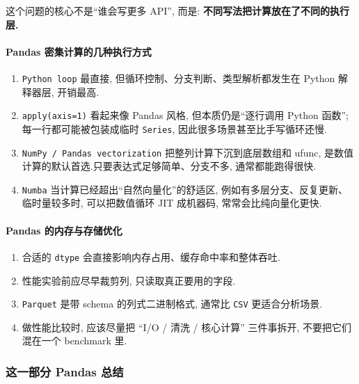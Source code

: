 \documentclass[11pt]{article}
\providecommand{\tightlist}{%
      \setlength{\itemsep}{0pt}\setlength{\parskip}{0pt}}
\begin{document}
    这个问题的核心不是``谁会写更多 API'', 而是:
\textbf{不同写法把计算放在了不同的执行层.}

    \paragraph{Pandas
密集计算的几种执行方式}\label{pandas-ux5bc6ux96c6ux8ba1ux7b97ux7684ux51e0ux79cdux6267ux884cux65b9ux5f0f}

    \begin{enumerate}
\def\labelenumi{\arabic{enumi}.}
\item
  \texttt{Python\ loop} 最直接, 但循环控制、分支判断、类型解析都发生在
  Python 解释器层, 开销最高.
\item
  \texttt{apply(axis=1)} 看起来像 Pandas 风格, 但本质仍是``逐行调用
  Python 函数''; 每一行都可能被包装成临时 \texttt{Series},
  因此很多场景甚至比手写循环还慢.
\item
  \texttt{NumPy\ /\ Pandas\ vectorization} 把整列计算下沉到底层数组和
  ufunc, 是数值计算的默认首选.只要表达式足够简单、分支不多,
  通常都能跑得很快.
\item
  \texttt{Numba} 当计算已经超出``自然向量化''的舒适区,
  例如有多层分支、反复更新、临时量较多时, 可以把数值循环 JIT 成机器码,
  常常会比纯向量化更快.
\end{enumerate}

    \paragraph{Pandas
的内存与存储优化}\label{pandas-ux7684ux5185ux5b58ux4e0eux5b58ux50a8ux4f18ux5316}

    \begin{enumerate}
\def\labelenumi{\arabic{enumi}.}
\tightlist
\item
  合适的 \texttt{dtype} 会直接影响内存占用、缓存命中率和整体吞吐.
\item
  性能实验前应尽早裁剪列, 只读取真正要用的字段.
\item
  \texttt{Parquet} 是带 schema 的列式二进制格式, 通常比 \texttt{CSV}
  更适合分析场景.
\item
  做性能比较时, 应该尽量把 ``I/O / 清洗 / 核心计算'' 三件事拆开,
  不要把它们混在一个 benchmark 里.
\end{enumerate}

    \subsubsection{这一部分 Pandas
总结}\label{ux8fd9ux4e00ux90e8ux5206-pandas-ux603bux7ed3}
\end{document}

